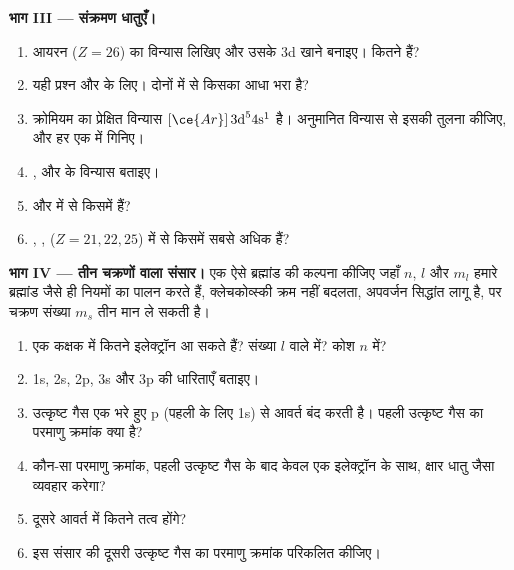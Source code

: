 \begin{problem}
\medskip
\noindent\textbf{भाग III --- संक्रमण धातुएँ।}
\begin{enumerate}[resume]
  \item आयरन ($Z = 26$) का विन्यास लिखिए और उसके 3d
        खाने बनाइए। कितने  हैं?
  \item यही प्रश्न  और  के लिए। दोनों में से किसका
         आधा भरा है?
  \item क्रोमियम का प्रेक्षित विन्यास $[\ce{Ar}]\,3\text{d}^5
        4\text{s}^1$ है। अनुमानित विन्यास से इसकी तुलना कीजिए, और हर एक में  गिनिए।
  \item {},  और  के विन्यास बताइए।
  \item {} और  में से किसमें  हैं?
  \item {}, ,  ($Z = 21, 22, 25$) में से
        किसमें सबसे अधिक  हैं?
\end{enumerate}

\medskip
\noindent\textbf{भाग IV --- तीन चक्रणों वाला संसार।}
एक ऐसे ब्रह्मांड की कल्पना कीजिए जहाँ $n$, $l$ और $m_l$ हमारे ब्रह्मांड जैसे
ही नियमों का पालन करते हैं, क्लेचकोव्स्की क्रम नहीं बदलता, अपवर्जन सिद्धांत लागू है,
पर चक्रण संख्या $m_s$ तीन मान ले सकती है।
\begin{enumerate}[resume]
  \item एक कक्षक में कितने इलेक्ट्रॉन आ सकते हैं? संख्या $l$ वाले 
        में? कोश $n$ में?
  \item 1s, 2s, 2p, 3s और 3p की धारिताएँ बताइए।
  \item उत्कृष्ट गैस एक भरे हुए p  (पहली के लिए 1s) से आवर्त
        बंद करती है। पहली उत्कृष्ट गैस का परमाणु क्रमांक क्या है?
  \item कौन-सा परमाणु क्रमांक, पहली उत्कृष्ट गैस के बाद केवल एक इलेक्ट्रॉन के साथ,
        क्षार धातु जैसा व्यवहार करेगा?
  \item दूसरे आवर्त में कितने तत्व होंगे?
  \item इस संसार की दूसरी उत्कृष्ट गैस का परमाणु क्रमांक परिकलित कीजिए।
\end{enumerate}
\end{problem}
